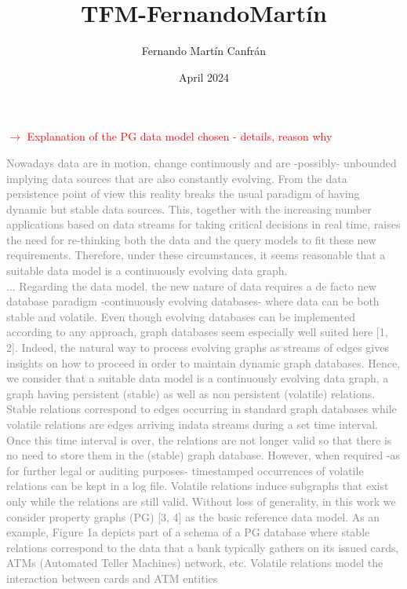 \documentclass{article}
\title{TFM-FernandoMartín}
\author{Fernando Martín Canfrán}
\date{April 2024}
\begin{document}
\textcolor{red}{$\rightarrow$ Explanation of the PG data model chosen - details, reason why}

\textcolor{gray}{Nowadays data are in motion, change continuously and are -possibly- unbounded implying data
sources that are also constantly evolving. From the data persistence point of view this reality breaks the
usual paradigm of having dynamic but stable data sources. This, together with the increasing number
applications based on data streams for taking critical decisions in real time, raises the need for re-thinking
both the data and the query models to fit these new requirements. Therefore, under these circumstances,
it seems reasonable that a suitable data model is a continuously evolving data graph.\\
...
Regarding the data model, the new nature of data requires a de facto new database paradigm
-continuously evolving databases- where data can be both stable and volatile. Even though
evolving databases can be implemented according to any approach, graph databases seem
especially well suited here [1, 2]. Indeed, the natural way to process evolving graphs as streams
of edges gives insights on how to proceed in order to maintain dynamic graph databases. Hence,
we consider that a suitable data model is a continuously evolving data graph, a graph having
persistent (stable) as well as non persistent (volatile) relations. Stable relations correspond
to edges occurring in standard graph databases while volatile relations are edges arriving indata streams during a set time interval. Once this time interval is over, the relations are not
longer valid so that there is no need to store them in the (stable) graph database. However,
when required -as for further legal or auditing purposes- timestamped occurrences of volatile
relations can be kept in a log file. Volatile relations induce subgraphs that exist only while the
relations are still valid. Without loss of generality, in this work we consider property graphs
(PG) [3, 4] as the basic reference data model. As an example, Figure 1a depicts part of a schema
of a PG database where stable relations correspond to the data that a bank typically gathers
on its issued cards, ATMs (Automated Teller Machines) network, etc. Volatile relations model
the interaction between cards and ATM entities}
\end{document}
